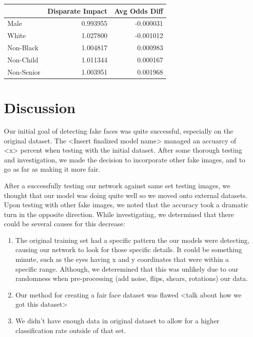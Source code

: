 \documentclass[11pt, letterpaper]{article}
\newenvironment{Figure}
  {\par\medskip\noindent\minipage{\linewidth}}
  {\endminipage\par\medskip}
\providecommand{\tightlist}{%
  \setlength{\itemsep}{0pt}\setlength{\parskip}{0pt}
}
\begin{document}
\begin{multicols}{2}
    \begin{Figure}
      \centering
      \label{fairnessmetrics}
      \begin{tabular}{lrr}
      \toprule
      {} &  Disparate Impact &  Avg Odds Diff \\
      \midrule
      Male       &                0.993955 &                -0.000031 \\
      White      &                1.027800 &                -0.001012 \\
      Non-Black  &                1.004817 &                 0.000983 \\
      Non-Child  &                1.011344 &                 0.000167 \\
      Non-Senior &                1.003951 &                 0.001968 \\
      \bottomrule
      \end{tabular}
      \end{Figure}

  \section{Discussion}
  Our initial goal of detecting fake faces was quite successful, especially on
  the original dataset. The <Insert finalized model name> managed an accuarcy of
  <x> percent when testing with the initial dataset. After some thorough testing
  and investigation, we made the decision to incorporate other fake images, and
  to go as far as making it more fair.

  After a successfully testing our network against same set testing images, we
  thought that our model was doing quite well so we moved onto external
  datasets. Upon testing with other fake images, we noted that the accuracy took
  a dramatic turn in the opposite direction. While investigating, we determined
  that there could be several causes for this decrease:

  \begin{enumerate}
    \tightlist
  		\item The original training set had a specific pattern the our models were
  		detecting, causing our network to look for those specific details. It
  		could be something minute, such as the eyes having x and y coordinates
  		that were within a specific range. Although, we deteremined that this was
  		unlikely due to our randomness when pre-processing (add noise, flips,
  		shears, rotations) our data.
  		\item Our method for creating a fair face dataset was flawed <talk about
  		how we got this dataset>
  		\item We didn't have enough data in original dataset to allow for a higher
  		classification rate outside of that set.
	\end{enumerate}


\end{multicols}
\end{document}
